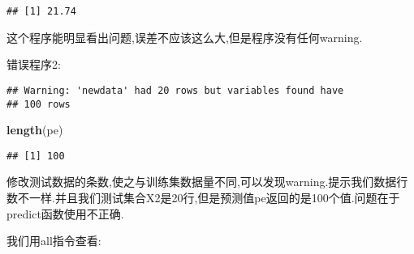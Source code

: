 \documentclass[]{ctexbook}
\newenvironment{Shaded}{\begin{snugshade}}{\end{snugshade}}
\newcommand{\DataTypeTok}[1]{\textcolor[rgb]{0.13,0.29,0.53}{#1}}
\newcommand{\DecValTok}[1]{\textcolor[rgb]{0.00,0.00,0.81}{#1}}
\newcommand{\FloatTok}[1]{\textcolor[rgb]{0.00,0.00,0.81}{#1}}
\newcommand{\KeywordTok}[1]{\textcolor[rgb]{0.13,0.29,0.53}{\textbf{#1}}}
\newcommand{\NormalTok}[1]{#1}
\newcommand{\OperatorTok}[1]{\textcolor[rgb]{0.81,0.36,0.00}{\textbf{#1}}}
\newcommand{\StringTok}[1]{\textcolor[rgb]{0.31,0.60,0.02}{#1}}
\begin{document}
\begin{verbatim}
## [1] 21.74
\end{verbatim}

这个程序能明显看出问题,误差不应该这么大,但是程序没有任何warning.

错误程序2:

\begin{Shaded}
\end{Shaded}

\begin{verbatim}
## Warning: 'newdata' had 20 rows but variables found have
## 100 rows
\end{verbatim}

\begin{Shaded}
\begin{Highlighting}[]
\KeywordTok{length}\NormalTok{(pe)}
\end{Highlighting}
\end{Shaded}

\begin{verbatim}
## [1] 100
\end{verbatim}

修改测试数据的条数,使之与训练集数据量不同,可以发现warning.提示我们数据行数不一样.并且我们测试集合X2是20行,但是预测值pe返回的是100个值.问题在于predict函数使用不正确.

我们用all指令查看:
\end{document}
